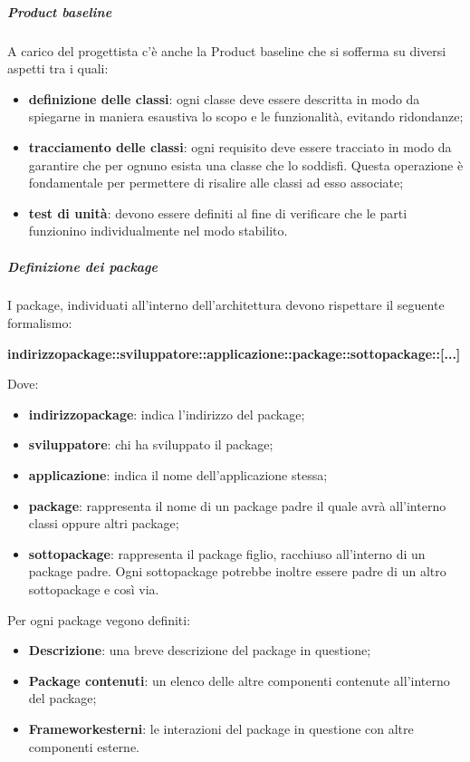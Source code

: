 			\subparagraph{Product baseline}
			A carico del progettista c'è anche la Product baseline che si sofferma su diversi aspetti tra i quali:
			\begin{itemize}
				\item \textbf{definizione delle classi}: ogni classe deve essere descritta in modo da spiegarne in maniera esaustiva lo scopo e le funzionalità, evitando ridondanze;
				\item \textbf{tracciamento delle classi}: ogni requisito deve essere tracciato in modo da garantire che per ognuno esista una classe che lo soddisfi. Questa operazione è fondamentale per permettere di risalire alle classi ad esso associate;
				\item \textbf{test di unità}: devono essere definiti al fine di verificare che le parti funzionino individualmente nel modo stabilito.
			\end{itemize}
			\subparagraph{Definizione dei package\glosp}
			I package, individuati all'interno dell'architettura devono rispettare il seguente formalismo:\newline \newline			\centerline{\textbf{indirizzo\textunderscore package::sviluppatore::applicazione::package::sottopackage::[...]}}\newline
			Dove:
			\begin{itemize}
			\item \textbf{indirizzo\textunderscore package}: indica l'indirizzo del package;
			\item \textbf{sviluppatore}: chi ha sviluppato il package;
			\item \textbf{applicazione}: indica il nome dell'applicazione stessa;
			\item \textbf{package}: rappresenta il nome di un package padre il quale avrà all'interno classi oppure altri package;
			\item \textbf{sottopackage}: rappresenta il package figlio, racchiuso all'interno di un package padre. Ogni sottopackage potrebbe inoltre essere padre di un altro sottopackage e così via.
			\end{itemize}
			Per ogni package vegono definiti:
			\begin{itemize}
			\item \textbf{Descrizione}: una breve descrizione del package in questione;
			\item \textbf{Package contenuti}: un elenco delle altre componenti contenute all'interno del package;
			\item \textbf{Framework\glosp esterni}: le interazioni del package in questione con altre componenti esterne.
			\end{itemize}
